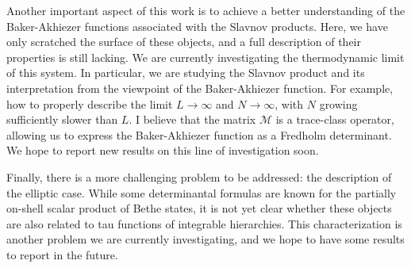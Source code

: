 \documentclass[a4paper,12pt]{amsart}
\begin{document}
Another important aspect of this work is to achieve a better
understanding of the Baker-Akhiezer functions associated with the
Slavnov products. Here, we have only scratched the surface of these
objects, and a full description of their properties is still
lacking. We are currently investigating the thermodynamic limit of
this system. In particular, we are studying the Slavnov product and
its interpretation from the viewpoint of the Baker-Akhiezer
function. For example, how to properly describe the limit \(L \to
\infty\) and \(N \to \infty\), with \(N\) growing sufficiently
slower than \(L\). I believe that the matrix \(\mathcal{M}\) is a
trace-class operator, allowing us to express the Baker-Akhiezer
function as a Fredholm determinant. We hope to report new results
on this line of investigation soon.

Finally, there is a more challenging problem to be addressed: the
description of the elliptic case. While some determinantal formulas
are known for the partially on-shell scalar product of Bethe states,
it is not yet clear whether these objects are also related to tau
functions of integrable hierarchies.  This characterization is another
problem we are currently investigating, and we hope to have some
results to report in the future.






\printbibliography
\end{document}
